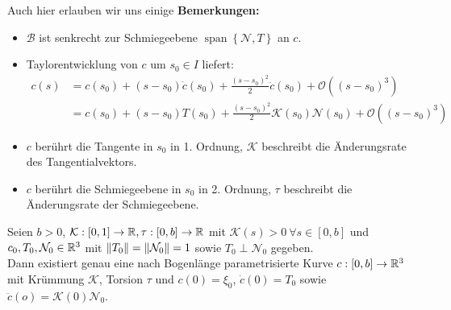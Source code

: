 Auch hier erlauben wir uns einige \textbf{Bemerkungen:}
\begin{itemize}
	\item $\mathcal{B}$ ist senkrecht zur Schmiegeebene $\operatorname{span}\left\{\mathcal{N},T\right\}$ an $c$.
	\item Taylorentwicklung von $c$ um $s_0 \in I$ liefert:
	\begin{align*}
	c(s) &= c(s_0)	+ (s-s_0)\dot{c}(s_0) + \frac{(s-s_0)^2}{2}\ddot{c}(s_0) + \mathcal{O}((s-s_0)^3) \\
	     &= c(s_0) + (s-s_0)T(s_0) + \frac{(s-s_0)^2}{2}\mathcal{K}(s_0)\mathcal{N}(s_0) + \mathcal{O}((s-s_0)^3)
	\end{align*}
	\item $c$ berührt die Tangente in $s_0$ in 1. Ordnung, $\mathcal{K}$ beschreibt die Änderungsrate des Tangentialvektors.
	\item $c$ berührt die Schmiegeebene in $s_0$ in 2. Ordnung, $\tau$ beschreibt die Änderungsrate der Schmiegeebene. 
\end{itemize}
\begin{satz}
	Seien $b>0$, $\mathcal{K}: [0,1]\rightarrow \mathbb{R}, \tau: [0,b]\rightarrow \mathbb{R}$ mit $\mathcal{K}(s)>0 \ \forall s \in [0,b]$ und $c_0, T_0, \mathcal{N}_0 \in \mathbb{R}^3$ mit $\norm{T_0} = \norm{\mathcal{N}_0} = 1$ sowie $T_0 \perp \mathcal{N}_0$ gegeben. \\
	Dann existiert genau eine nach Bogenlänge parametrisierte Kurve $c:[0,b]\rightarrow\mathbb{R}^3$ mit Krümmung $\mathcal{K}$, Torsion $\tau$ und $c(0) = \xi_0$, $\dot{c}(0) = T_0$ sowie $\ddot{c}(o) = \mathcal{K}(0)\mathcal{N}_0$.
\end{satz}
\begin{bew}
\end{bew}


